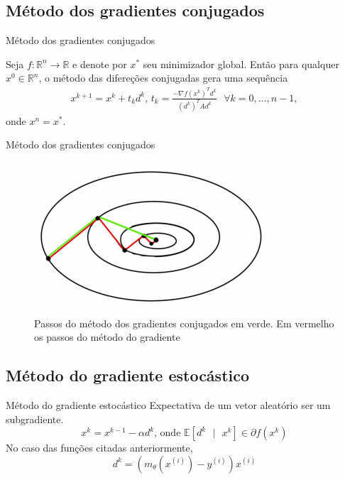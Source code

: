 \documentclass{beamer}
\begin{document}
    \subsection{Método dos gradientes conjugados}
        \begin{frame}{Método dos gradientes conjugados}
            \begin{theorem}
                Seja $f: \mathbb{R}^n \to \mathbb{R}$ e denote por $x^{*}$ seu minimizador global. Então para qualquer $x^0 \in \mathbb{R}^n$, o método das difereções conjugadas gera uma sequência
                \begin{gather*}
                x^{k+1} = x^{k} + t_{k}d^{k} \mbox{, } t_k = \frac{-\nabla f(x^k)^{T}d^k}{(d^k)^{T}Ad^k}\mbox{   } \forall k = 0,...,n-1 ,
                \end{gather*}
                onde $x^n = x^{*}$.
            \end{theorem}
        \end{frame}

        \begin{frame}{Método dos gradientes conjugados}
            \begin{figure}
                \centering
                \includegraphics[width=.8\textwidth]{gradienteconj.png}
                \caption{Passos do método dos gradientes conjugados em verde. Em vermelho os passos do método do gradiente}
                \label{fig:my_label}
            \end{figure}
        \end{frame}

    \subsection{Método do gradiente estocástico}
        \begin{frame}{Método do gradiente estocástico}
            Expectativa de um vetor aleatório ser um subgradiente.
            \begin{equation*}
                x^k = x^{k-1} - \alpha d^k\text{, onde }\mathbb{E}[d^k\mbox{ }\vert\mbox{ } x^k] \in \partial f(x^k)
            \end{equation*}
            No caso das funções citadas anteriormente,
            \begin{equation*}
                d^{k} = (m_\theta(x^{(i)}) - y^{(i)})x^{(i)}
            \end{equation*}
        \end{frame}
\end{document}
